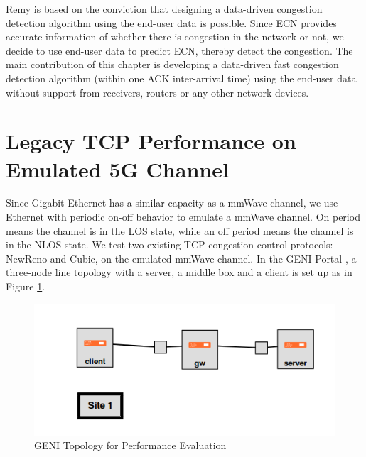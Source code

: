 \par Remy is based on the conviction that designing a data-driven congestion detection algorithm using the end-user data is possible. Since ECN provides accurate information of whether there is congestion in the network or not, we decide to use end-user data to predict ECN, thereby detect the congestion. The main contribution of this chapter is developing a data-driven fast congestion detection algorithm (within one ACK inter-arrival time) using the end-user data without support from receivers, routers or any other network devices.

\section{Legacy TCP Performance on Emulated 5G Channel}
\label{legacy}
\par Since Gigabit Ethernet has a similar capacity as a mmWave channel, we use Ethernet with periodic on-off behavior to emulate a mmWave channel. On period means the channel is in the LOS state, while an off period means the channel is in the NLOS state. We test two existing TCP congestion control protocols: NewReno and Cubic, on the emulated mmWave channel. In the GENI Portal \cite{Geni}, a three-node line topology with a server, a middle box and a client is set up as in Figure \ref{genitopo}. 
\begin{figure}
\centering
\includegraphics[width=14cm]{topologyGeni.png}
\caption{GENI Topology for Performance Evaluation}
\label{genitopo}
\end{figure}
